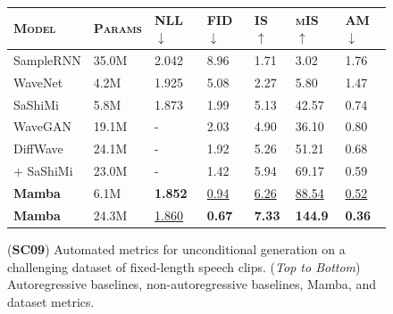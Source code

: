 \begin{figure}[!ht]
  \begin{minipage}[t]{.50\linewidth}
    \centering
    \captionsetup{type=table}
    \caption{
      (\textbf{SC09}) Automated metrics for unconditional generation on a challenging dataset of fixed-length speech clips.
      (\emph{Top to Bottom}) Autoregressive baselines, non-autoregressive baselines, Mamba, and dataset metrics.
    }
    \scriptsize
    \begin{tabular}{@{}lllllll@{}}
      \toprule
      \textsc{Model} & \textsc{Params} & \textsc{NLL $\downarrow$} & \textsc{FID $\downarrow$} & \textsc{IS $\uparrow$} & \textsc{mIS $\uparrow$} & \textsc{AM $\downarrow$}      \\
      \midrule
      SampleRNN      & 35.0M           & 2.042                     & 8.96                      & 1.71                   & 3.02                    & 1.76                                \\
      WaveNet        & 4.2M            & 1.925                     & 5.08                      & 2.27                   & 5.80                    & 1.47                                \\
      SaShiMi        & 5.8M            & 1.873                     & 1.99                      & 5.13                   & 42.57                   & 0.74                           \\
      \midrule
      WaveGAN        & 19.1M           & -                         & 2.03                      & 4.90                   & 36.10                   & 0.80                                \\
      DiffWave       & 24.1M           & -                         & 1.92                      & 5.26                   & 51.21                   & 0.68                                \\
      \;\; + SaShiMi & 23.0M           & -                         & 1.42                      & 5.94                   & 69.17                   & 0.59                           \\
      \midrule
      \textbf{Mamba} & 6.1M            & \textbf{1.852}            & \underline{0.94}          & \underline{6.26}       & \underline{88.54}       & \underline{0.52}                           \\
      \textbf{Mamba} & 24.3M           & \underline{1.860}         & \textbf{0.67}             & \textbf{7.33}          & \textbf{144.9}          & \textbf{0.36}                           \\

\end{tabular}
\end{minipage}
\end{figure}
